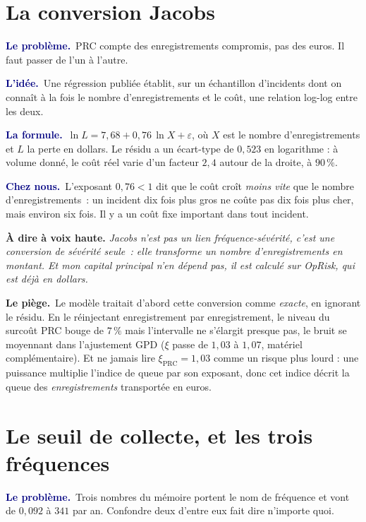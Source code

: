 \documentclass[11pt,a4paper]{article}
\newcommand{\lequoi}[1]{\smallskip\noindent\textcolor{navy}{\textbf{Le problème.}}\ #1\par}
\newcommand{\lidee}[1]{\smallskip\noindent\textcolor{navy}{\textbf{L'idée.}}\ #1\par}
\newcommand{\laformule}[1]{\smallskip\noindent\textcolor{navy}{\textbf{La formule.}}\ #1\par}
\newcommand{\cheznous}[1]{\smallskip\noindent\textcolor{navy}{\textbf{Chez nous.}}\ #1\par}
\newcommand{\lepiege}[1]{\smallskip\noindent\textcolor{accent}{\textbf{Le piège.}}\ #1\par}
\newcommand{\laphrase}[1]{\begin{phrasebox}\textbf{À dire à voix haute.} \emph{#1}\end{phrasebox}}
\begin{document}
\section{La conversion Jacobs}

\lequoi{PRC compte des enregistrements compromis, pas des euros. Il faut passer de l'un à
l'autre.}

\lidee{Une régression publiée établit, sur un échantillon d'incidents dont on connaît à la
fois le nombre d'enregistrements et le coût, une relation log-log entre les deux.}

\laformule{$\ln L = 7{,}68 + 0{,}76\,\ln X + \varepsilon$, où $X$ est le nombre
d'enregistrements et $L$ la perte en dollars. Le résidu a un écart-type de $0{,}523$ en logarithme :
à volume donné, le coût réel varie d'un facteur $2{,}4$ autour de la droite, à $90\,\%$.}

\cheznous{L'exposant $0{,}76 < 1$ dit que le coût croît \emph{moins vite} que le nombre
d'enregistrements~: un incident dix fois plus gros ne coûte pas dix fois plus cher, mais
environ six fois. Il y a un coût fixe important dans tout incident.}

\laphrase{Jacobs n'est pas un lien fréquence-sévérité, c'est une conversion de sévérité
seule~: elle transforme un nombre d'enregistrements en montant. Et mon capital principal
n'en dépend pas, il est calculé sur OpRisk, qui est déjà en dollars.}

\lepiege{Le modèle traitait d'abord cette conversion comme \emph{exacte}, en ignorant le résidu.
En le réinjectant enregistrement par enregistrement, le niveau du surcoût PRC bouge de $7\,\%$ mais
l'intervalle ne s'élargit presque pas, le bruit se moyennant dans l'ajustement GPD ($\xi$ passe de
$1{,}03$ à $1{,}07$, matériel complémentaire). Et ne jamais lire $\xi_{\text{PRC}}=1{,}03$ comme un
risque plus lourd : une puissance multiplie l'indice de queue par son exposant, donc cet indice
décrit la queue des \emph{enregistrements} transportée en euros.}

\section{Le seuil de collecte, et les trois fréquences}

\lequoi{Trois nombres du mémoire portent le nom de \og{}fréquence\fg{} et vont de $0{,}092$ à
$341$ par an. Confondre deux d'entre eux fait dire n'importe quoi.}
\end{document}
